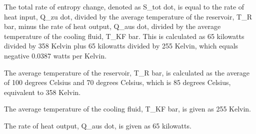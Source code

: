 The total rate of entropy change, denoted as S_tot dot, is equal to the rate of heat input, Q_zu dot, divided by the average temperature of the reservoir, T_R bar, minus the rate of heat output, Q_aus dot, divided by the average temperature of the cooling fluid, T_KF bar. This is calculated as 65 kilowatts divided by 358 Kelvin plus 65 kilowatts divided by 255 Kelvin, which equals negative 0.0387 watts per Kelvin.

The average temperature of the reservoir, T_R bar, is calculated as the average of 100 degrees Celsius and 70 degrees Celsius, which is 85 degrees Celsius, equivalent to 358 Kelvin.

The average temperature of the cooling fluid, T_KF bar, is given as 255 Kelvin.

The rate of heat output, Q_aus dot, is given as 65 kilowatts.